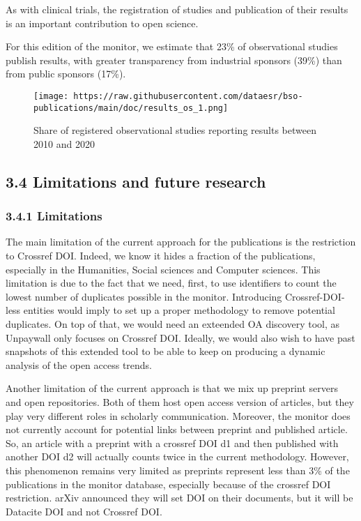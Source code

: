 \documentclass[
]{article}
\begin{document}
As with clinical trials, the registration of studies and publication of
their results is an important contribution to open science.

For this edition of the monitor, we estimate that 23\% of observational
studies publish results, with greater transparency from industrial
sponsors (39\%) than from public sponsors (17\%).

\begin{figure}
\centering
\texttt{[image: https://raw.githubusercontent.com/dataesr/bso-publications/main/doc/results\_os\_1.png]}
\caption{Share of registered observational studies reporting results
between 2010 and 2020}
\end{figure}

\hypertarget{limitations-and-future-research}{%
\subsection{3.4 Limitations and future
research}\label{limitations-and-future-research}}

\hypertarget{limitations}{%
\subsubsection{3.4.1 Limitations}\label{limitations}}

The main limitation of the current approach for the publications is the
restriction to Crossref DOI. Indeed, we know it hides a fraction of the
publications, especially in the Humanities, Social sciences and Computer
sciences. This limitation is due to the fact that we need, first, to use
identifiers to count the lowest number of duplicates possible in the
monitor. Introducing Crossref-DOI-less entities would imply to set up a
proper methodology to remove potential duplicates. On top of that, we
would need an exteended OA discovery tool, as Unpaywall only focuses on
Crossref DOI. Ideally, we would also wish to have past snapshots of this
extended tool to be able to keep on producing a dynamic analysis of the
open access trends.

Another limitation of the current approach is that we mix up preprint
servers and open repositories. Both of them host open access version of
articles, but they play very different roles in scholarly communication.
Moreover, the monitor does not currently account for potential links
between preprint and published article. So, an article with a preprint
with a crossref DOI d1 and then published with another DOI d2 will
actually counts twice in the current methodology. However, this
phenomenon remains very limited as preprints represent less than 3\% of
the publications in the monitor database, especially because of the
crossref DOI restriction. arXiv announced they will set DOI on their
documents, but it will be Datacite DOI and not Crossref DOI.
\end{document}
